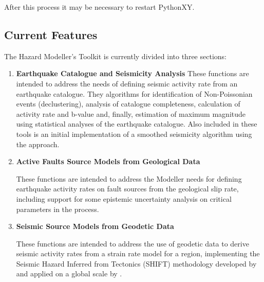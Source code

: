 After this process it may be necessary to restart PythonXY.

\subsection{Current Features}

The Hazard Modeller's Toolkit is currently divided into three sections: 

\begin{enumerate}
\item \textbf{Earthquake Catalogue and Seismicity Analysis}
    These functions are intended to address the needs of defining seismic activity rate from an earthquake catalogue. They algorithms for identification of Non-Poissonian events (declustering), analysis of catalogue completeness, calculation of activity rate and b-value and, finally, estimation of maximum magnitude using statistical analyses of the earthquake catalogue. Also included in these tools is an initial implementation of a smoothed seismicity algorithm using the \cite{frankel1995} approach.
     
\item \textbf{Active Faults Source Models from Geological Data}

    These functions are intended to address the Modeller needs for defining earthquake activity rates on fault sources from the geological slip rate, including support for some epistemic uncertainty analysis on critical parameters in the process.

\item \textbf{Seismic Source Models from Geodetic Data}

    These functions are intended to address the use of geodetic data to derive seismic activity rates from a strain rate model for a region, implementing the Seismic Hazard Inferred from Tectonics (SHIFT) methodology developed by \cite{BirdLiu2007} and applied on a global scale by \cite{Bird_etal2010}.
\end{enumerate}

